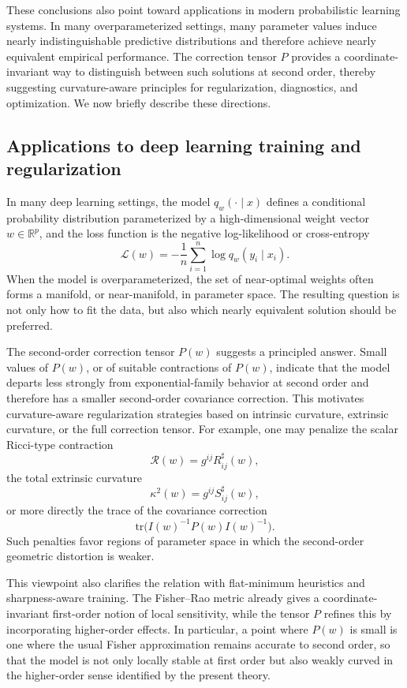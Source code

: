 \documentclass[11pt,letterpaper]{amsart}
\numberwithin{equation}{section}
\theoremstyle{plain}
\theoremstyle{definition}
\theoremstyle{remark}
\begin{document}
These conclusions also point toward applications in modern probabilistic learning systems. In many overparameterized settings, many parameter values induce nearly indistinguishable predictive distributions and therefore achieve nearly equivalent empirical performance. The correction tensor \(P\) provides a coordinate-invariant way to distinguish between such solutions at second order, thereby suggesting curvature-aware principles for regularization, diagnostics, and optimization. We now briefly describe these directions.

\subsection{Applications to deep learning training and regularization}\label{sec:deep_learning}

In many deep learning settings, the model \(q_w(\cdot\mid x)\) defines a conditional probability distribution parameterized by a high-dimensional weight vector \(w\in\mathbb R^p\), and the loss function is the negative log-likelihood or cross-entropy
\[
\mathcal L(w)=-\frac1n\sum_{i=1}^n \log q_w(y_i\mid x_i).
\]
When the model is overparameterized, the set of near-optimal weights often forms a manifold, or near-manifold, in parameter space. The resulting question is not only how to fit the data, but also which nearly equivalent solution should be preferred.

The second-order correction tensor \(P(w)\) suggests a principled answer. Small values of \(P(w)\), or of suitable contractions of \(P(w)\), indicate that the model departs less strongly from exponential-family behavior at second order and therefore has a smaller second-order covariance correction. This motivates curvature-aware regularization strategies based on intrinsic curvature, extrinsic curvature, or the full correction tensor. For example, one may penalize the scalar Ricci-type contraction
\[
\mathcal R(w)=g^{ij}R^\sharp_{ij}(w),
\]
the total extrinsic curvature
\[
\kappa^2(w)=g^{ij}S^\sharp_{ij}(w),
\]
or more directly the trace of the covariance correction
\[
\mathrm{tr}\bigl(I(w)^{-1}P(w)I(w)^{-1}\bigr).
\]
Such penalties favor regions of parameter space in which the second-order geometric distortion is weaker.

This viewpoint also clarifies the relation with flat-minimum heuristics and sharpness-aware training. The Fisher--Rao metric already gives a coordinate-invariant first-order notion of local sensitivity, while the tensor \(P\) refines this by incorporating higher-order effects. In particular, a point where \(P(w)\) is small is one where the usual Fisher approximation remains accurate to second order, so that the model is not only locally stable at first order but also weakly curved in the higher-order sense identified by the present theory.
\end{document}
